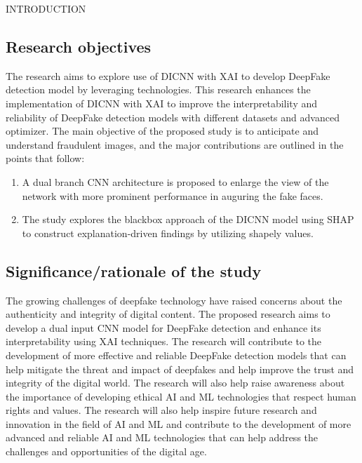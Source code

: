 \begin{section}[]{\uppercase{Introduction}}
    \subsection{Research objectives}
    The research aims to explore use of DICNN with XAI to develop DeepFake detection model by leveraging technologies. This research enhances the implementation of DICNN with XAI to improve the interpretability and reliability of DeepFake detection models with different datasets and advanced optimizer.
    The main objective of the proposed study is to anticipate and understand fraudulent images, and the major contributions are outlined in the points that follow:
    \begin{enumerate}[label=\bf{O\arabic*}]
        \item A dual branch CNN architecture is proposed to enlarge the view of the network with more prominent performance in auguring the fake faces.
        \item The study explores the blackbox approach of the DICNN model using SHAP to construct explanation-driven findings by utilizing shapely values.
    \end{enumerate}

    
    \subsection{Significance/rationale of the study}
    The growing challenges of deepfake technology have raised concerns about the authenticity and integrity of digital content. 
    The proposed research aims to develop a dual input CNN model for DeepFake detection and enhance its interpretability using XAI techniques. 
    The research will contribute to the development of more effective and reliable DeepFake detection models that can help mitigate the threat and impact of deepfakes and help improve the trust and integrity of the digital world. 
    The research will also help raise awareness about the importance of developing ethical AI and ML technologies that respect human rights and values. 
    The research will also help inspire future research and innovation in the field of AI and ML and contribute to the development of more advanced and reliable AI and ML technologies that can help address the challenges and opportunities of the digital age.


\end{section}

